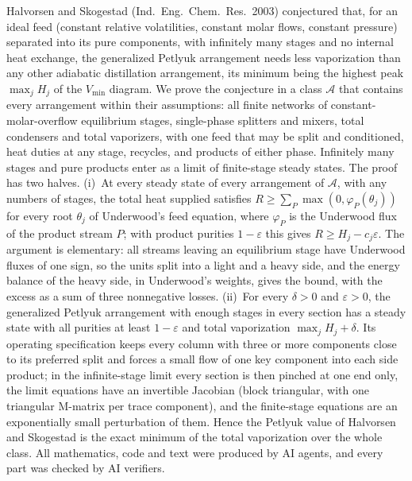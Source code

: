\documentclass[11pt,a4paper]{report}
\newcommand{\cA}{\mathcal A}
\begin{document}
\makepapertitle

\begin{paperabstract}
Halvorsen and Skogestad (Ind.\ Eng.\ Chem.\ Res.\ 2003) conjectured that, for an ideal feed (constant relative
volatilities, constant molar flows, constant pressure) separated into its pure components, with infinitely many stages
and no internal heat exchange, the generalized Petlyuk arrangement needs less vaporization than any other adiabatic
distillation arrangement, its minimum being the highest peak \(\max_jH_j\) of the \(V_{\min}\) diagram. We prove the
conjecture in a class \(\cA\) that contains every arrangement within their assumptions: all finite networks of
constant-molar-overflow equilibrium stages, single-phase splitters and mixers, total condensers and total vaporizers,
with one feed that may be split and conditioned, heat duties at any stage, recycles, and products of either phase.
Infinitely many stages and pure products enter as a limit of finite-stage steady states. The proof has two halves.
(i)~At every steady state of every arrangement of \(\cA\), with any numbers of stages, the total heat supplied
satisfies \(R\ge\sum_P\max(0,\varphi_P(\theta_j))\) for every root \(\theta_j\) of Underwood's feed equation, where
\(\varphi_P\) is the Underwood flux of the product stream \(P\); with product purities \(1-\varepsilon\) this gives
\(R\ge H_j-c_j\varepsilon\). The argument is elementary: all streams leaving an equilibrium stage have Underwood fluxes of
one sign, so the units split into a light and a heavy side, and the energy balance of the heavy side, in Underwood's
weights, gives the bound, with the excess as a sum of three nonnegative losses. (ii)~For every \(\delta>0\) and
\(\varepsilon>0\), the generalized Petlyuk arrangement with enough stages in every section has a steady state with all
purities at least \(1-\varepsilon\) and total vaporization \(\max_jH_j+\delta\). Its operating specification keeps every
column with three or more components close to its preferred split and forces a small flow of one key component into
each side product; in the infinite-stage limit every section is then pinched at one end only, the limit equations have
an invertible Jacobian (block triangular, with one triangular M-matrix per trace component), and the finite-stage
equations are an exponentially small perturbation of them. Hence the Petlyuk value of Halvorsen and Skogestad is the
exact minimum of the total vaporization over the whole class. All mathematics, code and text were produced by AI
agents, and every part was checked by AI verifiers.
\end{paperabstract}
\end{document}
